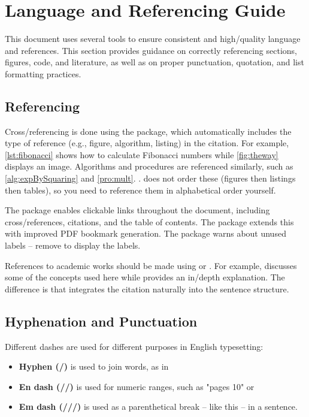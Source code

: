 \section{Language and Referencing Guide}

This document uses several tools to ensure consistent and high\-/quality language and references. This section provides guidance on correctly referencing sections, figures, code, and literature, as well as on proper punctuation, quotation, and list formatting practices.

\subsection{Referencing}

Cross\-/referencing is done using the  package, which automatically includes the type of reference (e.g., figure, algorithm, listing) in the citation. For example, \cref{lst:fibonacci} shows how to calculate Fibonacci numbers while \cref{fig:theway} displays an image. Algorithms and procedures are referenced similarly, such as \cref{alg:expBySquaring} and \cref{pro:mult}. .  does not order these (figures then listings then tables), so you need to reference them in alphabetical order yourself.

The  package enables clickable links throughout the document, including cross\-/references, citations, and the table of contents. The  package extends this with improved PDF bookmark generation. The  package warns about unused labels \--- remove  to display the labels.

References to academic works should be made using \latexinline{\cite} or \latexinline{\textcite}. For example, \cite{xx00} discusses some of the concepts used here while \textcite{xx00} provides an in\-/depth explanation. The difference is that \latexinline{\textcite} integrates the citation naturally into the sentence structure.

\subsection{Hyphenation and Punctuation}

Different dashes are used for different purposes in English typesetting:
\begin{itemize}
    \item \textbf{Hyphen (\-/)} is used to join words, as in 
    \item \textbf{En dash (\-/\-/)} is used for numeric ranges, such as "pages 10" or 
    \item \textbf{Em dash (\-/\-/\-/)} is used as a parenthetical break \--- like this \--- in a sentence.
\end{itemize}

